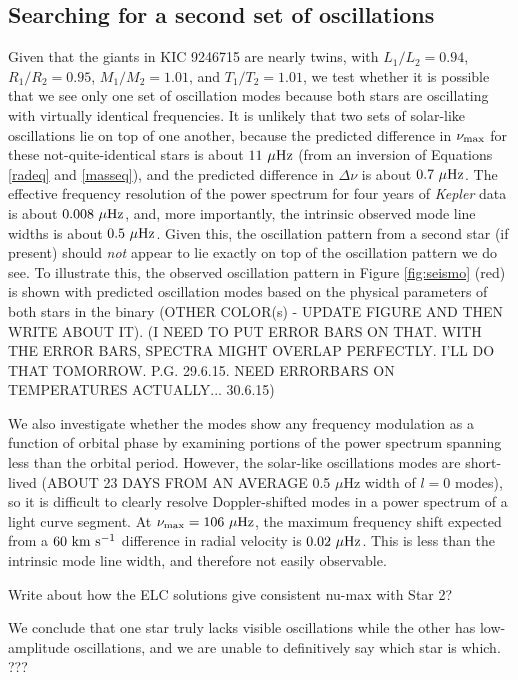 \subsection{Searching for a second set of oscillations}

Given that the giants in KIC 9246715 are nearly twins, with $L_1/L_2 = 0.94$, $R_1/R_2 = 0.95$, $M_1/M_2 = 1.01$, and $T_1/T_2 = 1.01$, we test whether it is possible that we see only one set of oscillation modes because both stars are oscillating with virtually identical frequencies. It is unlikely that two sets of solar-like oscillations lie on top of one another, because the predicted difference in $\nu_{\rm{max}}$ for these not-quite-identical stars is about $11 \ \mu \rm{Hz}$ (from an inversion of Equations \ref{radeq} and \ref{masseq}), and the predicted difference in $\Delta \nu$ is about $0.7 \ \mu \rm{Hz}$. The effective frequency resolution of the power spectrum for four years of \emph{Kepler} data is about $0.008 \ \mu \rm{Hz}$, and, more importantly, the intrinsic observed mode line widths is about $0.5 \ \mu \rm{Hz}$.
Given this, the oscillation pattern from a second star (if present) should \emph{not} appear to lie exactly on top of the oscillation pattern we do see. To illustrate this, the observed oscillation pattern in Figure \ref{fig:seismo} (red) is shown with predicted oscillation modes based on the physical parameters of both stars in the binary (OTHER COLOR(s) - UPDATE FIGURE AND THEN WRITE ABOUT IT). (I NEED TO PUT ERROR BARS ON THAT. WITH THE ERROR BARS, SPECTRA MIGHT OVERLAP PERFECTLY. I'LL DO THAT TOMORROW. P.G. 29.6.15. NEED ERRORBARS ON TEMPERATURES ACTUALLY... 30.6.15)

We also investigate whether the modes show any frequency modulation as a function of orbital phase by examining portions of the power spectrum spanning less than the orbital period. However, the solar-like oscillations modes are short-lived (ABOUT 23 DAYS FROM AN AVERAGE 0.5 $\mu$Hz width of $l=0$ modes), so it is difficult to clearly resolve Doppler-shifted modes in a power spectrum of a light curve segment. At $\nu_{\rm{max}} = 106 \ \mu \rm{Hz}$, the maximum frequency shift expected from a $60 \ \rm{km} \ \rm{s}^{-1}$ difference in radial velocity is $0.02 \ \mu \rm{Hz}$. This is less than the intrinsic mode line width, and therefore not easily observable.

Write about how the ELC solutions give consistent nu-max with Star 2?

We conclude that one star truly lacks visible oscillations while the other has low-amplitude oscillations, and we are unable to definitively say which star is which. ???
    
    
    
    
    
    
  
  
  
  